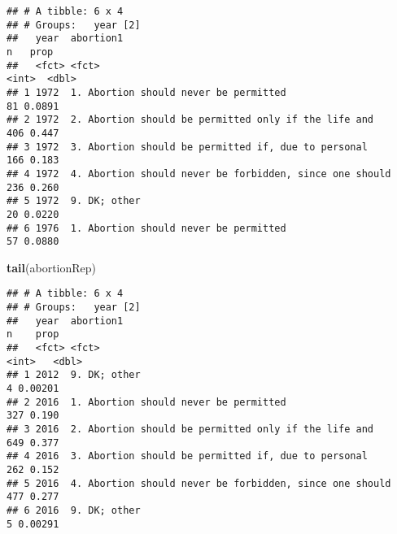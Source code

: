\documentclass[
]{article}
\newenvironment{Shaded}{\begin{snugshade}}{\end{snugshade}}
\newcommand{\KeywordTok}[1]{\textcolor[rgb]{0.13,0.29,0.53}{\textbf{#1}}}
\newcommand{\NormalTok}[1]{#1}
\begin{document}
\begin{verbatim}
## # A tibble: 6 x 4
## # Groups:   year [2]
##   year  abortion1                                                   n   prop
##   <fct> <fct>                                                   <int>  <dbl>
## 1 1972  1. Abortion should never be permitted                      81 0.0891
## 2 1972  2. Abortion should be permitted only if the life and      406 0.447 
## 3 1972  3. Abortion should be permitted if, due to personal       166 0.183 
## 4 1972  4. Abortion should never be forbidden, since one should   236 0.260 
## 5 1972  9. DK; other                                               20 0.0220
## 6 1976  1. Abortion should never be permitted                      57 0.0880
\end{verbatim}

\begin{Shaded}
\begin{Highlighting}[]
\KeywordTok{tail}\NormalTok{(abortionRep)}
\end{Highlighting}
\end{Shaded}

\begin{verbatim}
## # A tibble: 6 x 4
## # Groups:   year [2]
##   year  abortion1                                                   n    prop
##   <fct> <fct>                                                   <int>   <dbl>
## 1 2012  9. DK; other                                                4 0.00201
## 2 2016  1. Abortion should never be permitted                     327 0.190  
## 3 2016  2. Abortion should be permitted only if the life and      649 0.377  
## 4 2016  3. Abortion should be permitted if, due to personal       262 0.152  
## 5 2016  4. Abortion should never be forbidden, since one should   477 0.277  
## 6 2016  9. DK; other                                                5 0.00291
\end{verbatim}
\end{document}
